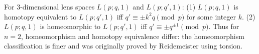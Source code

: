 For 3-dimensional lens spaces $L(p; q, 1)$ and $L(p; q', 1)$:
(1) $L(p; q, 1)$ is homotopy equivalent to $L(p; q', 1)$ iff $q' \equiv \pm k^2 q \pmod{p}$ for some integer $k$.
(2) $L(p; q, 1)$ is homeomorphic to $L(p; q', 1)$ iff $q' \equiv \pm q^{\pm 1} \pmod{p}$.
Thus for $n = 2$, homeomorphism and homotopy equivalence differ: the homeomorphism classification is finer and was originally proved by Reidemeister using torsion.
